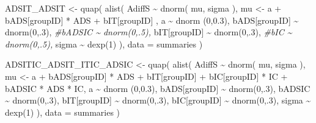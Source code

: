 \documentclass[
  10pt,
  dvipsnames,enabledeprecatedfontcommands]{scrartcl}
\newenvironment{Shaded}{\begin{snugshade}}{\end{snugshade}}
\newcommand{\AttributeTok}[1]{\textcolor[rgb]{0.77,0.63,0.00}{#1}}
\newcommand{\CommentTok}[1]{\textcolor[rgb]{0.56,0.35,0.01}{\textit{#1}}}
\newcommand{\DecValTok}[1]{\textcolor[rgb]{0.00,0.00,0.81}{#1}}
\newcommand{\FloatTok}[1]{\textcolor[rgb]{0.00,0.00,0.81}{#1}}
\newcommand{\FunctionTok}[1]{\textcolor[rgb]{0.00,0.00,0.00}{#1}}
\newcommand{\NormalTok}[1]{#1}
\newcommand{\OtherTok}[1]{\textcolor[rgb]{0.56,0.35,0.01}{#1}}
\newcommand{\SpecialCharTok}[1]{\textcolor[rgb]{0.00,0.00,0.00}{#1}}
\begin{document}
\begin{Shaded}
\begin{Highlighting}[]
\NormalTok{ADSIT\_ADSIT }\OtherTok{\textless{}{-}} \FunctionTok{quap}\NormalTok{(}
  \FunctionTok{alist}\NormalTok{(}
\NormalTok{    AdiffS }\SpecialCharTok{\textasciitilde{}} \FunctionTok{dnorm}\NormalTok{( mu, sigma ),}
\NormalTok{    mu }\OtherTok{\textless{}{-}}\NormalTok{ a }\SpecialCharTok{+}\NormalTok{ bADS[groupID] }\SpecialCharTok{*}\NormalTok{ ADS }\SpecialCharTok{+}\NormalTok{  bIT[groupID] ,}
\NormalTok{    a }\SpecialCharTok{\textasciitilde{}} \FunctionTok{dnorm}\NormalTok{ (}\DecValTok{0}\NormalTok{,}\FloatTok{0.3}\NormalTok{),}
\NormalTok{    bADS[groupID] }\SpecialCharTok{\textasciitilde{}} \FunctionTok{dnorm}\NormalTok{(}\DecValTok{0}\NormalTok{,.}\DecValTok{3}\NormalTok{),}
    \CommentTok{\#bADSIC \textasciitilde{} dnorm(0,.5),}
\NormalTok{    bIT[groupID] }\SpecialCharTok{\textasciitilde{}} \FunctionTok{dnorm}\NormalTok{(}\DecValTok{0}\NormalTok{,.}\DecValTok{3}\NormalTok{),}
    \CommentTok{\#bIC \textasciitilde{} dnorm(0,.5),}
\NormalTok{    sigma  }\SpecialCharTok{\textasciitilde{}} \FunctionTok{dexp}\NormalTok{(}\DecValTok{1}\NormalTok{)}
\NormalTok{  ), }
  \AttributeTok{data =}\NormalTok{ summaries}
\NormalTok{)}


\NormalTok{ADSITIC\_ADSIT\_ITIC\_ADSIC }\OtherTok{\textless{}{-}} \FunctionTok{quap}\NormalTok{(}
  \FunctionTok{alist}\NormalTok{(}
\NormalTok{    AdiffS }\SpecialCharTok{\textasciitilde{}} \FunctionTok{dnorm}\NormalTok{( mu, sigma ),}
\NormalTok{    mu }\OtherTok{\textless{}{-}}\NormalTok{ a }\SpecialCharTok{+}\NormalTok{ bADS[groupID] }\SpecialCharTok{*}\NormalTok{ ADS }\SpecialCharTok{+}\NormalTok{  bIT[groupID] }\SpecialCharTok{+}\NormalTok{ bIC[groupID] }\SpecialCharTok{*}\NormalTok{ IC }\SpecialCharTok{+}
\NormalTok{      bADSIC }\SpecialCharTok{*}\NormalTok{ ADS }\SpecialCharTok{*}\NormalTok{ IC,}
\NormalTok{    a }\SpecialCharTok{\textasciitilde{}} \FunctionTok{dnorm}\NormalTok{ (}\DecValTok{0}\NormalTok{,}\FloatTok{0.3}\NormalTok{),}
\NormalTok{    bADS[groupID] }\SpecialCharTok{\textasciitilde{}} \FunctionTok{dnorm}\NormalTok{(}\DecValTok{0}\NormalTok{,.}\DecValTok{3}\NormalTok{),}
\NormalTok{    bADSIC }\SpecialCharTok{\textasciitilde{}} \FunctionTok{dnorm}\NormalTok{(}\DecValTok{0}\NormalTok{,.}\DecValTok{3}\NormalTok{),}
\NormalTok{    bIT[groupID] }\SpecialCharTok{\textasciitilde{}} \FunctionTok{dnorm}\NormalTok{(}\DecValTok{0}\NormalTok{,.}\DecValTok{3}\NormalTok{),}
\NormalTok{    bIC[groupID] }\SpecialCharTok{\textasciitilde{}} \FunctionTok{dnorm}\NormalTok{(}\DecValTok{0}\NormalTok{,.}\DecValTok{3}\NormalTok{),}
\NormalTok{    sigma  }\SpecialCharTok{\textasciitilde{}} \FunctionTok{dexp}\NormalTok{(}\DecValTok{1}\NormalTok{)}
\NormalTok{  ), }
  \AttributeTok{data =}\NormalTok{ summaries}
\NormalTok{)}



\end{Highlighting}
\end{Shaded}
\end{document}
